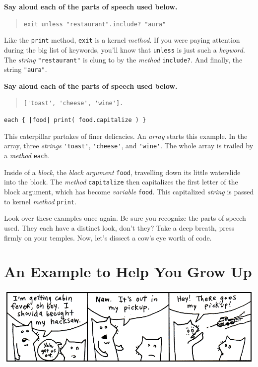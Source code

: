 \documentclass[10pt,twoside]{report}
\begin{document}
{\bf Say aloud each of the parts of speech used below.}

\begin{quote}
\lstinline[breaklines=true]|exit unless "restaurant".include? "aura"|\end{quote}


Like the \lstinline[breaklines=true]|print| method,
\lstinline[breaklines=true]|exit| is a kernel {\em method}.  If you
were paying attention during the big list of keywords, you'll know
that \lstinline[breaklines=true]|unless| is just such a {\em keyword}.
The {\em string} \lstinline[breaklines=true]|"restaurant"| is clung to
by the {\em method} \lstinline[breaklines=true]|include?|.  And
finally, the string \lstinline[breaklines=true]|"aura"|.

{\bf Say aloud each of the parts of speech used below.}

\begin{quote}
\lstinline[breaklines=true]|['toast', 'cheese', 'wine'].|\end{quote}

\lstinline[breaklines=true]$each { |food| print( food.capitalize ) }$

This caterpillar partakes of finer delicacies.  An {\em array} starts
this example.  In the array, three {\em strings}
\lstinline[breaklines=true]|'toast'|,
\lstinline[breaklines=true]|'cheese'|, and
\lstinline[breaklines=true]|'wine'|.  The whole array is trailed by a
          {\em method} \lstinline[breaklines=true]|each|.

Inside of a {\em block}, the {\em block argument}
\lstinline[breaklines=true]|food|, travelling down its little
waterslide into the block.  The {\em method}
\lstinline[breaklines=true]|capitalize| then capitalizes the first
letter of the block argument, which has become {\em variable}
\lstinline[breaklines=true]|food|.  This capitalized {\em string} is
passed to kernel {\em method} \lstinline[breaklines=true]|print|.

Look over these examples once again.  Be sure you recognize the parts
of speech used.  They each have a distinct look, don't they?  Take a
deep breath, press firmly on your temples.  Now, let's dissect a cow's
eye worth of code.


\section{An Example to Help You Grow Up}


	\includegraphics[width=1.0\textwidth]{cache/17.png}
\end{document}
